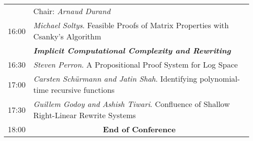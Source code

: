 \documentclass[landscape,12pt]{article}
\newcommand\textbfit[1]{{\bf\em #1}\index{#1}}
\begin{document}
\begin{tabular}{p{1cm}p{21cm}}
\hline
& Chair: \emph{Arnaud Durand}\\
16:00 & 	\emph{Michael Soltys}. Feasible Proofs of Matrix Properties with Csanky's Algorithm\\
	& \textbfit{Implicit Computational Complexity and Rewriting}\\
16:30 & 	\emph{Steven Perron}. A Propositional Proof System for Log Space\\
17:00 & 	\emph{Carsten Sch\"urmann and Jatin Shah}. Identifying polynomial-time recursive functions\\
17:30 & 	\emph{Guillem Godoy and Ashish Tiwari}. Confluence of Shallow
Right-Linear Rewrite Systems\\
\hline
18:00 & \multicolumn{1}{c}{\textbf{End of Conference}}\\
\hline
\end{tabular}
\end{document}
